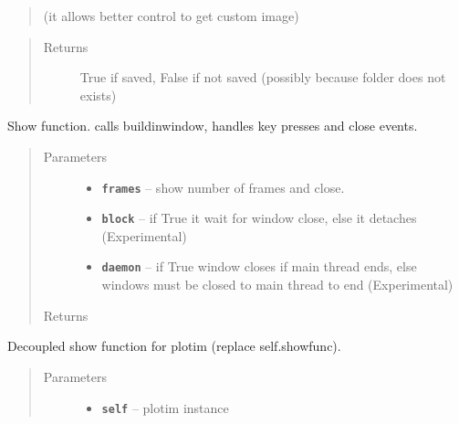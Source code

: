 \documentclass[letterpaper,10pt,english]{sphinxmanual}
\begin{document}
\begin{fulllineitems}
\begin{fulllineitems}
\begin{quote}
(it allows better control to get custom image)
\end{quote}
\begin{quote}\begin{description}
\item[{Returns}] \leavevmode
True if saved, False if not saved (possibly because folder does not exists)

\end{description}\end{quote}

\end{fulllineitems}


\begin{fulllineitems}
\label{RRtoolbox.lib:RRtoolbox.lib.plotter.plotim.show}
Show function. calls buildinwindow, handles key presses and close events.
\begin{quote}\begin{description}
\item[{Parameters}] \leavevmode\begin{itemize}
\item {} 
\textbf{\texttt{frames}} -- show number of frames and close.

\item {} 
\textbf{\texttt{block}} -- if True it wait for window close, else it detaches (Experimental)

\item {} 
\textbf{\texttt{daemon}} -- if True window closes if main thread ends,
else windows must be closed to main thread to end (Experimental)

\end{itemize}

\item[{Returns}] \leavevmode


\end{description}\end{quote}

\end{fulllineitems}


\begin{fulllineitems}
\label{RRtoolbox.lib:RRtoolbox.lib.plotter.plotim.showfunc}
Decoupled show function for plotim (replace self.showfunc).
\begin{quote}\begin{description}
\item[{Parameters}] \leavevmode\begin{itemize}
\item {} 
\textbf{\texttt{self}} -- plotim instance


\end{itemize}
\end{description}
\end{quote}
\end{fulllineitems}
\end{fulllineitems}
\end{document}
